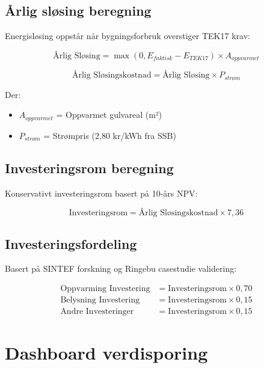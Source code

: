\documentclass[12pt,a4paper]{article}
\begin{document}
\subsection{Årlig sløsing beregning}

Energisløsing oppstår når bygningsforbruk overstiger TEK17 krav:

\begin{equation}
\text{Årlig Sløsing} = \max(0, E_{faktisk} - E_{TEK17}) \times A_{oppvarmet}
\end{equation}

\begin{equation}
\text{Årlig Sløsingskostnad} = \text{Årlig Sløsing} \times P_{strøm}
\end{equation}

Der:
\begin{itemize}
\item $A_{oppvarmet}$ = Oppvarmet gulvareal (m²)
\item $P_{strøm}$ = Strømpris (2,80 kr/kWh fra SSB)
\end{itemize}

\subsection{Investeringsrom beregning}

Konservativt investeringsrom basert på 10-års NPV:

\begin{equation}
\text{Investeringsrom} = \text{Årlig Sløsingskostnad} \times 7,36
\end{equation}

\subsection{Investeringsfordeling}

Basert på SINTEF forskning og Ringebu casestudie validering:

\begin{align}
\text{Oppvarming Investering} &= \text{Investeringsrom} \times 0,70 \\
\text{Belysning Investering} &= \text{Investeringsrom} \times 0,15 \\
\text{Andre Investeringer} &= \text{Investeringsrom} \times 0,15
\end{align}

\section{Dashboard verdisporing}
\end{document}
